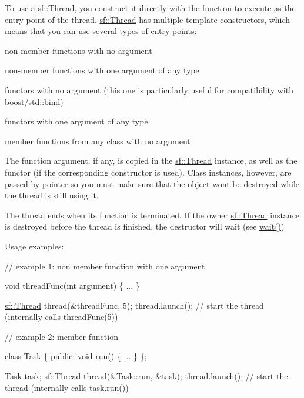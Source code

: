 To use a \hyperlink{classsf_1_1Thread}{sf\+::\+Thread}, you construct it directly with the function to execute as the entry point of the thread. \hyperlink{classsf_1_1Thread}{sf\+::\+Thread} has multiple template constructors, which means that you can use several types of entry points\+: \begin{DoxyItemize}
\item non-\/member functions with no argument \item non-\/member functions with one argument of any type \item functors with no argument (this one is particularly useful for compatibility with boost/std\+:\+:bind) \item functors with one argument of any type \item member functions from any class with no argument\end{DoxyItemize}
The function argument, if any, is copied in the \hyperlink{classsf_1_1Thread}{sf\+::\+Thread} instance, as well as the functor (if the corresponding constructor is used). Class instances, however, are passed by pointer so you must make sure that the object won\textquotesingle{}t be destroyed while the thread is still using it.

The thread ends when its function is terminated. If the owner \hyperlink{classsf_1_1Thread}{sf\+::\+Thread} instance is destroyed before the thread is finished, the destructor will wait (see \hyperlink{classsf_1_1Thread_a724b1f94c2d54f84280f2f78bde95fa0}{wait()})

Usage examples\+: 
\begin{DoxyCode}
\textcolor{comment}{// example 1: non member function with one argument}

\textcolor{keywordtype}{void} threadFunc(\textcolor{keywordtype}{int} argument)
\{
    ...
\}

\hyperlink{classsf_1_1Thread}{sf::Thread} thread(&threadFunc, 5);
thread.launch(); \textcolor{comment}{// start the thread (internally calls threadFunc(5))}
\end{DoxyCode}



\begin{DoxyCode}
\textcolor{comment}{// example 2: member function}

\textcolor{keyword}{class }Task
\{
\textcolor{keyword}{public}:
    \textcolor{keywordtype}{void} run()
    \{
        ...
    \}
\};

Task task;
\hyperlink{classsf_1_1Thread}{sf::Thread} thread(&Task::run, &task);
thread.launch(); \textcolor{comment}{// start the thread (internally calls task.run())}
\end{DoxyCode}



